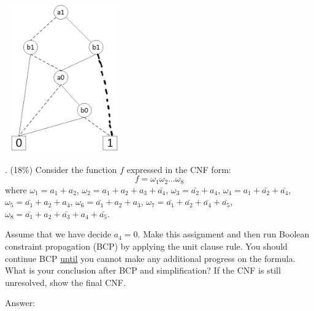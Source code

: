 \documentclass[12pt]{article}
\begin{document}
    \begin{center}
        \includegraphics[width = 2.00in, height = 2.50in]{figure5.png}
    \end{center}

    . (18\%) Consider the function $f$ expressed in the CNF form:
    \[
        f = \omega_{1}\omega_{2}\dots\omega_{8}
    \]
    where $\omega_{1} = a_{1} + a_{2}$,
    $\omega_{2} = a_{1} + a_{2} + a_{3} + \bar{a_{4}}$,
    $\omega_{3} = \bar{a_{2}} + a_{4}$,
    $\omega_{4} = a_{1} + \bar{a_{2}} + \bar{a_{4}}$,
    $\omega_{5} = \bar{a_{1}} + a_{2} + a_{4}$,
    $\omega_{6} = \bar{a_{1}} + a_{2} + a_{3}$,
    $\omega_{7} = \bar{a_{1}} + \bar{a_{2}} + \bar{a_{4}} + \bar{a_5}$,
    $\omega_{8} = \bar{a_{1}} + a_{2} + \bar{a_{3}} + a_{4} + \bar{a_5}$.

    \noindent
    Assume that we have decide $a_{4} = 0$.
    Make this assignment and then run Boolean constraint propagation (BCP) by applying the unit clause rule.
    You should continue BCP \underline{until} you cannot make any additional progress on the formula.
    What is your conclusion after BCP and simplification?
    If the CNF is still unresolved, show the final CNF\@.

    \noindent
    Answer:
\end{document}
